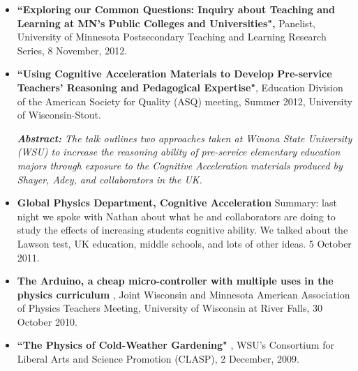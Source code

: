 \documentclass[margin,line,letterpaper]{res}
\begin{document}
\begin{resume}
\begin{itemize}
\item \textbf{``Exploring our Common Questions: Inquiry about Teaching and Learning at MN's Public Colleges and Universities",}
Panelist, University of Minnesota Postsecondary Teaching and Learning Research Series,
8 November, 2012.


\item \textbf{``Using Cognitive Acceleration Materials to Develop 
Pre-service Teachers' Reasoning and Pedagogical Expertise"}, 
Education Division of the American Society for Quality (ASQ) meeting, Summer 2012, University of Wisconsin-Stout.

\textit{\textbf{Abstract:}
The talk outlines two approaches taken at Winona State University (WSU) to increase the reasoning ability of pre-service elementary education majors through exposure to the Cognitive Acceleration materials produced by Shayer, Adey, and collaborators in the UK.}


\item \textbf{Global Physics Department, Cognitive Acceleration}  Summary: last night we spoke with Nathan about what he and collaborators are doing to study the effects of increasing students cognitive ability. We talked about the Lawson test, UK education, middle schools, and lots of other ideas. 5 October 2011.

\item 
\textbf{The Arduino, a cheap micro-controller with multiple uses in the physics curriculum}
, Joint Wisconsin and Minnesota American Association of Physics Teachers Meeting, University of Wisconsin at River Falls, 30 October 2010.



\item %
\textbf{``The Physics of Cold-Weather Gardening"}%
, WSU's Consortium for Liberal Arts and Science Promotion (CLASP), 2 December, 2009.


\end{itemize}
\end{resume}
\end{document}

